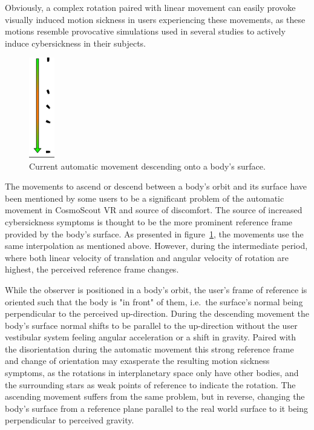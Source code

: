 Obviously, a complex rotation paired with linear movement can easily provoke visually induced motion sickness in
users experiencing these movements, as these motions resemble provocative simulations used in several studies to
actively induce cybersickness in their subjects.


\begin{figure}
    \centering
    \includegraphics[width=0.1\textwidth]{content/3_current_state/img/OldAutomaticNavigation_Landing}
    \caption{Current automatic movement descending onto a body's surface.}
    \label{fig:old-auto-nav-descend}
\end{figure}

The movements to ascend or descend between a body's orbit and its surface have been mentioned by some users to be a
significant problem of the automatic movement in CosmoScout VR and source of discomfort.
The source of increased cybersickness symptoms is thought to be the more prominent reference frame provided by the
body's surface.
As presented in figure~\ref{fig:old-auto-nav-descend}, the movements use the same interpolation as mentioned above.
However, during the intermediate period, where both linear velocity of translation and angular velocity of rotation
are highest, the perceived reference frame changes.

While the observer is positioned in a body's orbit, the user's frame of reference is oriented such that the body is
"in front" of them, i.e.\ the surface's normal being perpendicular to the perceived up-direction.
During the descending movement the body's surface normal shifts to be parallel to the up-direction without the user
vestibular system feeling angular acceleration or a shift in gravity.
Paired with the disorientation during the automatic movement this strong reference frame and change of orientation may
exasperate the resulting motion sickness symptoms, as the rotations in interplanetary space only have other bodies,
and the surrounding stars as weak points of reference to indicate the rotation.
The ascending movement suffers from the same problem, but in reverse, changing the body's surface from a reference
plane parallel to the real world surface to it being perpendicular to perceived gravity.

